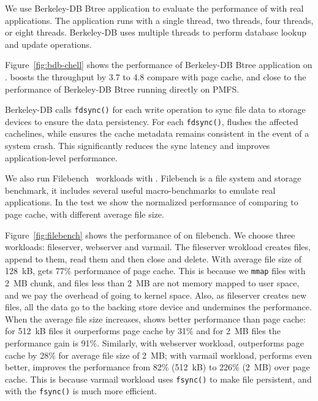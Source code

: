 We use Berkeley-DB Btree application to evaluate the performance of
\CChell{} with real applications.
The application runs with a
single thread, two threads, four threads, or eight threads. Berkeley-DB
uses multiple threads to perform database lookup and update operations.

Figure~\ref{fig:bdb-chell} shows the performance of Berkeley-DB Btree
application on \CChell{}.  \Chell{} boosts the
throughput by 3.7\x{} to 4.8\x{} compare with page cache, and close to the
performance of Berkeley-DB Btree running directly on PMFS.

Berkeley-DB calls \texttt{fdsync()} for each
write operation to sync
file data to storage devices to ensure the data persistency.
For each \texttt{fdsync()}, \lib{} flushes the affected cachelines, while \drv{} ensures the cache metadata remains consistent in the event of a system crash.  This significantly reduces the sync latency and improves application-level performance.


We also run Filebench~\cite{filebench} workloads with \CChell{}. Filebench
is a file system and storage benchmark, it includes several useful
macro-benchmarks to emulate real applications. In the test we show the
normalized performance of \CChell{} comparing to page cache, with different
average file size.

Figure~\ref{fig:filebench} shows the performance of \CChell{} on filebench.
We choose three workloads: fileserver, webserver and varmail.
The fileserver wrokload creates files, append to them, read them and
then close and delete.
With average file size of 128~kB, \CChell{} gets 77\% performance
of page cache. This is because we \texttt{mmap} files with 2~MB chunk,
and files less than 2~MB are not memory mapped to user space, and we pay
the overhead of going to kernel space. Also, as fileserver creates new files,
all the data go to the backing store device and undermines the \CChell{}
performance. When the average file size increases, \CChell{} shows better
performance than page cache: for 512~kB files it ourperforms page cache
by 31\% and for 2~MB files the performance gain is 91\%. Similarly, with
webserver workload, \CChell{} outperforms page cache by 28\% for average
file size of 2~MB; with varmail workload, \CChell[] performs even better,
improves the performance from 82\% (512~kB) to 226\% (2~MB) over page cache.
This is because varmail workload uses \texttt{fsync()} to make file
persistent, and with \CChell{} the \texttt{fsync()} is much more efficient.




